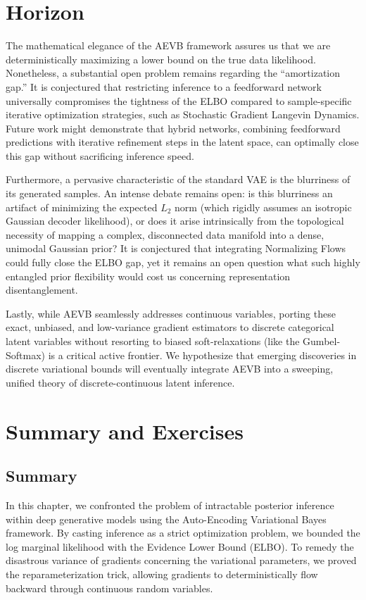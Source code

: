 \section{Horizon}
\begin{horizon}
The mathematical elegance of the AEVB framework assures us that we are deterministically maximizing a lower bound on the true data likelihood. Nonetheless, a substantial open problem remains regarding the ``amortization gap.'' It is conjectured that restricting inference to a feedforward network universally compromises the tightness of the ELBO compared to sample-specific iterative optimization strategies, such as Stochastic Gradient Langevin Dynamics. Future work might demonstrate that hybrid networks, combining feedforward predictions with iterative refinement steps in the latent space, can optimally close this gap without sacrificing inference speed.

Furthermore, a pervasive characteristic of the standard VAE is the blurriness of its generated samples. An intense debate remains open: is this blurriness an artifact of minimizing the expected $L_2$ norm (which rigidly assumes an isotropic Gaussian decoder likelihood), or does it arise intrinsically from the topological necessity of mapping a complex, disconnected data manifold into a dense, unimodal Gaussian prior? It is conjectured that integrating Normalizing Flows could fully close the ELBO gap, yet it remains an open question what such highly entangled prior flexibility would cost us concerning representation disentanglement.

Lastly, while AEVB seamlessly addresses continuous variables, porting these exact, unbiased, and low-variance gradient estimators to discrete categorical latent variables without resorting to biased soft-relaxations (like the Gumbel-Softmax) is a critical active frontier. We hypothesize that emerging discoveries in discrete variational bounds will eventually integrate AEVB into a sweeping, unified theory of discrete-continuous latent inference.
\end{horizon}

\section{Summary and Exercises}
\subsection{Summary}
In this chapter, we confronted the problem of intractable posterior inference within deep generative models using the Auto-Encoding Variational Bayes framework. By casting inference as a strict optimization problem, we bounded the log marginal likelihood with the Evidence Lower Bound (ELBO). To remedy the disastrous variance of gradients concerning the variational parameters, we proved the reparameterization trick, allowing gradients to deterministically flow backward through continuous random variables. 

